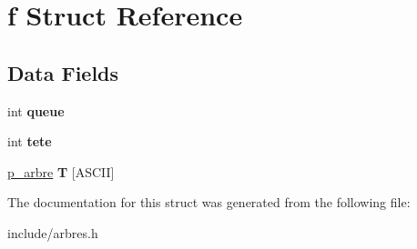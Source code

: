 \hypertarget{structf}{}\section{f Struct Reference}
\label{structf}
\subsection*{Data Fields}
\begin{DoxyCompactItemize}
\item 
\mbox{\label{structf_a404442353660d7effc914ba8220ebf7f}} 
int {\bfseries queue}
\item 
\mbox{\label{structf_a7a7f6a8c2aff18cc12cd5a8784bb3608}} 
int {\bfseries tete}
\item 
\mbox{\label{structf_a12508ee756c9f9ca97e5a0a02ba10c19}} 
\mbox{\hyperlink{structa}{p\+\_\+arbre}} {\bfseries T} \mbox{[}A\+S\+C\+II\mbox{]}
\end{DoxyCompactItemize}


The documentation for this struct was generated from the following file\+:\begin{DoxyCompactItemize}
\item 
include/arbres.\+h\end{DoxyCompactItemize}
